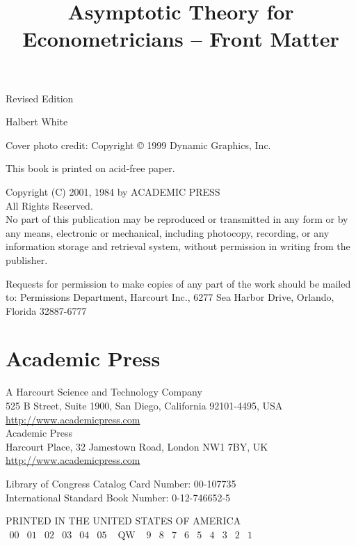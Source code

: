 \documentclass[10pt]{article}
\title{Asymptotic Theory for Econometricians -- Front Matter}
\author{}
\date{}
\begin{document}
\maketitle

\maketitle
Revised Edition

Halbert White

Cover photo credit: Copyright © 1999 Dynamic Graphics, Inc.

This book is printed on acid-free paper.

Copyright (C) 2001, 1984 by ACADEMIC PRESS\\
All Rights Reserved.\\
No part of this publication may be reproduced or transmitted in any form or by any means, electronic or mechanical, including photocopy, recording, or any information storage and retrieval system, without permission in writing from the publisher.

Requests for permission to make copies of any part of the work should be mailed to: Permissions Department, Harcourt Inc., 6277 Sea Harbor Drive, Orlando, Florida 32887-6777

\section*{Academic Press}
A Harcourt Science and Technology Company\\
525 B Street, Suite 1900, San Diego, California 92101-4495, USA\\
\href{http://www.academicpress.com}{http://www.academicpress.com}\\
Academic Press\\
Harcourt Place, 32 Jamestown Road, London NW1 7BY, UK\\
\href{http://www.academicpress.com}{http://www.academicpress.com}

Library of Congress Catalog Card Number: 00-107735\\
International Standard Book Number: 0-12-746652-5

PRINTED IN THE UNITED STATES OF AMERICA\\
$\begin{array}{lllllllllllllllll}00 & 01 & 02 & 03 & 04 & 05 & \text { QW } & 9 & 8 & 7 & 6 & 5 & 4 & 3 & 2 & 1\end{array}$
\end{document}
